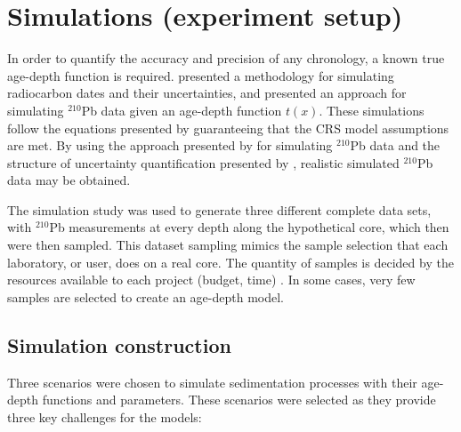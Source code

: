 \documentclass [10pt] {article}
\begin{document}



\section{Simulations (experiment setup)}

	In order to quantify the accuracy and precision of any chronology, a known true age-depth function is required.
\citet{Blaauw2018} presented a methodology for simulating radiocarbon dates and their uncertainties, and \citet{Aquino2018} presented an approach for simulating $^{210}$Pb data given an age-depth function $t(x)$.
These simulations follow the equations presented by \cite{Appleby1978, Robbins1978} guaranteeing that the CRS model assumptions are met. 
By using the approach presented by \citet{Aquino2018} for simulating $^{210}$Pb data and the structure of uncertainty quantification presented by \citet{Blaauw2018}, realistic simulated $^{210}$Pb data may be obtained.

The simulation study was used to generate three different complete data sets, with $^{210}$Pb measurements at every depth along the hypothetical core, which then were then sampled. This dataset sampling mimics the sample selection that each laboratory, or user, does on a real core. The quantity of samples is decided by the resources available to each project (budget, time) \citep{Blaauw2018}. 
In some cases, very few samples are selected to create an age-depth model.

\subsection{Simulation construction}\label{sec:SimConst}

Three scenarios were chosen to simulate sedimentation processes with their age-depth functions and parameters. These scenarios were selected as they provide three key challenges for the models:
\end{document}
